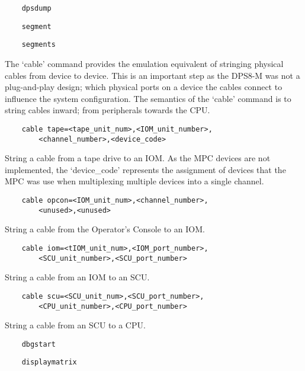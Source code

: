 \documentclass[notitlepage]{report}
\begin{document}
\begin{lstlisting}
	dpsdump
\end{lstlisting}

\begin{lstlisting}
	segment
\end{lstlisting}

\begin{lstlisting}
	segments
\end{lstlisting}

The `cable' command provides the emulation equivalent of stringing physical cables from device to device. This is an important step as the DPS8-M was not a plug-and-play design; which physical ports on a device the cables connect to influence the system configuration. The semantics of the `cable' command is to string cables inward; from peripherals towards the CPU.
\begin{lstlisting}
	cable tape=<tape_unit_num>,<IOM_unit_number>,
		<channel_number>,<device_code>
\end{lstlisting}
	String a cable from a tape drive to an IOM. As the MPC devices are not implemented, the `device\_code' represents the assignment of devices that the MPC was use when multiplexing multiple devices into a single channel.

\begin{lstlisting}
	cable opcon=<IOM_unit_num>,<channel_number>,
		<unused>,<unused>
\end{lstlisting}

	String a cable from the Operator's Console to an IOM.

\begin{lstlisting}
	cable iom=<tIOM_unit_num>,<IOM_port_number>,
		<SCU_unit_number>,<SCU_port_number>
\end{lstlisting}

	String a cable from an IOM to an SCU.

\begin{lstlisting}
	cable scu=<SCU_unit_num>,<SCU_port_number>,
		<CPU_unit_number>,<CPU_port_number>
\end{lstlisting}

	String a cable from an SCU to a CPU.

\begin{lstlisting}
	dbgstart
\end{lstlisting}

\begin{lstlisting}
	displaymatrix
\end{lstlisting}
\end{document}
